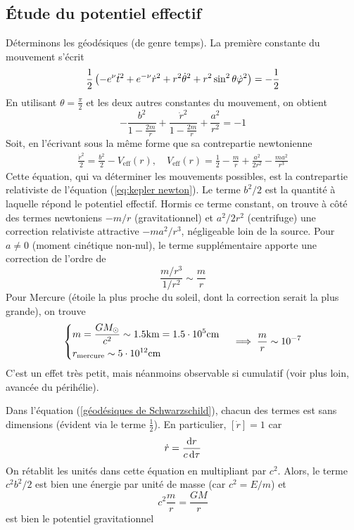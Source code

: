 \subsection{Étude du potentiel effectif}
Déterminons les géodésiques (de genre temps). La première constante du mouvement s'écrit 
\begin{equation}
    \frac{1}{2} \left( - e^\nu \dot{t}^2 + e^{-\nu} \dot{r}^2 + r^2 \dot{\theta}^2 +r^2 \sin^2 \theta \dot{\varphi}^2\right) = - \frac{1}{2}
\end{equation}
En utilisant $\theta = \frac{\pi}{2}$ et les deux autres constantes du mouvement, on obtient
\begin{equation}
    - \frac{b^2}{1 - \frac{2m}{r}} + \frac{\dot{r}^2}{1 - \frac{2m}{r}} + \frac{a^2}{r^2} = -1
\end{equation}
Soit, en l'écrivant sous la même forme que sa contrepartie newtonienne
\begin{align}
    \label{géodésiques de Schwarzschild}
    \boxed{\frac{\dot{r}^2}{2} = \frac{b^2}{2} - V_\text{eff} (r), \quad V_\text{eff} (r) = \frac{1}{2} - \frac{m}{r} + \frac{a^2}{2r^2} - \frac{ma^2}{r^3}}
\end{align}
Cette équation, qui va déterminer les mouvements possibles, est la contrepartie relativiste de l'équation (\ref{eq:kepler newton}). Le terme $b^2/2$ est la quantité à laquelle répond le potentiel effectif. Hormis ce terme constant, on trouve à côté des termes newtoniens $-m/r$ (gravitationnel) et $a^2/2r^2$ (centrifuge) une correction relativiste attractive $-ma^2/r^3$, négligeable loin de la source. Pour $a \neq 0$ (moment cinétique non-nul), le terme supplémentaire apporte une correction de l'ordre de
\begin{equation}
    \frac{m/r^3}{1/r^2} \sim \frac{m}{r}
\end{equation}
Pour Mercure (étoile la plus proche du soleil, dont la correction serait la plus grande), on trouve
\begin{equation}
    \begin{dcases}
        m = \frac{GM_\odot}{c^2} \sim 1.5\text{km} = 1.5 \cdot 10^5\text{cm} \\
        r_\text{mercure}\sim 5 \cdot 10^{12}\text{cm} \\
    \end{dcases}
    \quad\implies \frac{m}{r} \sim 10^{-7}
\end{equation}
C'est un effet très petit, mais néanmoins observable si cumulatif (voir plus loin, avancée du périhélie).
\begin{rmk}
    Dans l'équation (\ref{géodésiques de Schwarzschild}), chacun des termes est sans dimensions (évident via le terme $\frac{1}{2}$). En particulier, $[\dot{r}] = 1$ car
    \begin{equation*}
        \dot{r} = \frac{\mathrm{d} r}{c \, \mathrm{d} \tau}
    \end{equation*}
    On rétablit les unités dans cette équation en multipliant par $c^2$. Alors, le terme $c^2b^2/2$ est bien une énergie par unité de masse (car $c^2 = E/m$) et
    \begin{equation*}
        c^2 \frac{m}{r} = \frac{GM}{r}
    \end{equation*}
    est bien le potentiel gravitationnel
\end{rmk}
